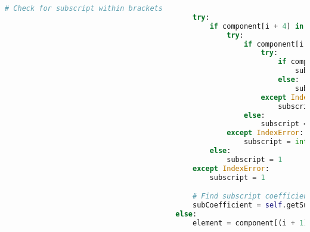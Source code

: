 \documentclass[a4paper,12pt]{article}
\begin{document}
\begin{lstlisting}[language=Python, caption=parseComponent method for finding elements]
                                            # Check for subscript within brackets
                                            try:
                                                if component[i + 4] in self.integers:
                                                    try:
                                                        if component[i + 5] in self.integers:
                                                            try:
                                                                if component[i + 6] in self.integers:
                                                                    subscript = int(component[(i + 4): (i + 7)])
                                                                else:
                                                                    subscript = int(component[(i + 4): (i + 6)])
                                                            except IndexError:
                                                                subscript = int(component[(i + 4): (i + 6)])
                                                        else:
                                                            subscript = int(component[i + 4])
                                                    except IndexError:
                                                        subscript = int(component[i + 4])
                                                else:
                                                    subscript = 1
                                            except IndexError:
                                                subscript = 1

                                            # Find subscript coefficient of complex ion
                                            subCoefficient = self.getSubCoefficient(component)
                                        else:
                                            element = component[(i + 1): (i + 3)]


\end{lstlisting}
\end{document}
